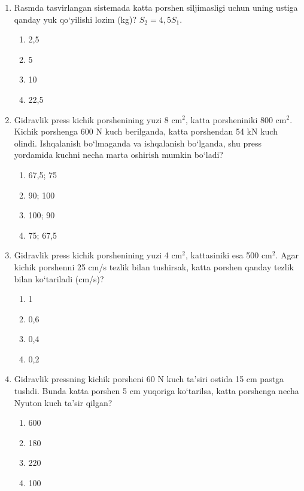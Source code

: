 \begin{enumerate}
\item Rasmda tasvirlangan sistemada katta porshen siljimasligi uchun 
uning ustiga qanday yuk qo‘yilishi lozim (kg)? 
$S_2=4,5S_1$.

\begin{enumerate}[label=\Alph*)]
\item 2,5
\item 5
\item 10
\item 22,5
\end{enumerate}


\item Gidravlik press kichik porshenining yuzi 8 cm$^2$, 
katta porsheniniki 800 cm$^2$. 
Kichik porshenga 600 N kuch berilganda, katta porshendan 
54 kN kuch olindi. Ishqalanish bo‘lmaganda va ishqalanish bo‘lganda, 
shu press yordamida kuchni necha marta oshirish mumkin bo‘ladi?

\begin{enumerate}[label=\Alph*)]
\item 67,5; 75
\item 90; 100
\item 100; 90
\item 75; 67,5
\end{enumerate}


\item Gidravlik press kichik porshenining yuzi 4 cm$^2$, 
kattasiniki esa 500 cm$^2$. 
Agar kichik porshenni 25 cm/s tezlik bilan tushirsak, 
katta porshen qanday tezlik bilan ko‘tariladi (cm/s)?

\begin{enumerate}[label=\Alph*)]
\item 1
\item 0,6
\item 0,4
\item 0,2
\end{enumerate}


\item Gidravlik pressning kichik porsheni 60 N kuch ta’siri ostida 
15 cm pastga tushdi. Bunda katta porshen 5 cm yuqoriga ko‘tarilsa, 
katta porshenga necha Nyuton kuch ta’sir qilgan?

\begin{enumerate}[label=\Alph*)]
\item 600
\item 180
\item 220
\item 100
\end{enumerate}



\end{enumerate}

